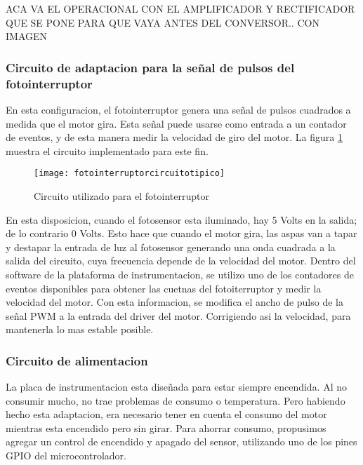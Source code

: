 ACA VA EL OPERACIONAL CON EL AMPLIFICADOR Y RECTIFICADOR QUE SE PONE PARA QUE VAYA ANTES DEL CONVERSOR.. CON IMAGEN




\subsubsection{Circuito de adaptacion para la señal de pulsos del fotointerruptor} %
\label{ssub:circuito_de_adaptacion_para_la_señal_de_pulsos_del_fotointerruptor}


En esta configuracion, el fotointerruptor genera una señal de pulsos cuadrados a medida que el motor gira. Esta señal puede usarse como entrada a un contador de eventos, y de esta manera medir la velocidad de giro del motor. La figura \ref{fig:fotointerruptorcircuitotipico} muestra el circuito implementado para este fin. 

\begin{figure}[h]
  \centering
  \texttt{[image: fotointerruptorcircuitotipico]}
  \caption{Circuito utilizado para el fotointerruptor}\label{fig:fotointerruptorcircuitotipico}
\end{figure}

En esta disposicion, cuando el fotosensor esta iluminado, hay 5 Volts en la salida; de lo contrario 0 Volts. Esto hace que cuando el motor gira, las aspas van a tapar y destapar la entrada de luz al fotosensor generando una onda cuadrada a la salida del circuito, cuya frecuencia depende de la velocidad del motor. Dentro del software de la plataforma de instrumentacion, se utilizo uno de los contadores de eventos disponibles para obtener las cuetnas del fotoiterruptor y medir la velocidad del motor. Con esta informacion, se modifica el ancho de pulso de la señal PWM a la entrada del driver del motor. Corrigiendo asi la velocidad, para mantenerla lo mas estable posible. 


\subsubsection{Circuito de alimentacion} %
\label{ssub:circuito_de_alimentacion}

La placa de instrumentacion esta diseñada para estar siempre encendida. Al no consumir mucho, no trae problemas de consumo o temperatura. Pero habiendo hecho esta adaptacion, era necesario tener en cuenta el consumo del motor mientras esta encendido pero sin girar. Para ahorrar consumo, propusimos agregar un control de encendido y apagado del sensor, utilizando uno de los pines GPIO del microcontrolador. \\

